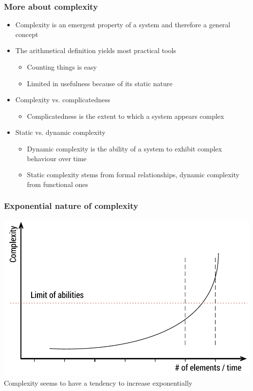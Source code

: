 \documentclass[10pt, compress]{beamer}
\begin{document}
\begin{frame}
	\frametitle{More about complexity}
	\begin{itemize}
		\item Complexity is an emergent property of a system and therefore a general concept
		\item The arithmetical definition yields most practical tools
		\begin{itemize}
			\item Counting things is easy
			\item Limited in usefulness because of its static nature
		\end{itemize}
		\item Complexity vs. complicatedness
		\begin{itemize}
			\item Complicatedness is the extent to which a system appears complex
		\end{itemize}
		\item Static vs. dynamic complexity
		\begin{itemize}
			\item Dynamic complexity is the ability of a system to exhibit complex behaviour over time
			\item Static complexity stems from formal relationships, dynamic complexity from functional ones
		\end{itemize}
	\end{itemize}
\end{frame}

\begin{frame}
	\frametitle{Exponential nature of complexity}
	\begin{center}
		\includegraphics[width=.8\textwidth]{exp_complex.pdf}\\[3mm]
	Complexity seems to have a tendency to increase exponentially
	\end{center}

\end{frame}
\end{document}
